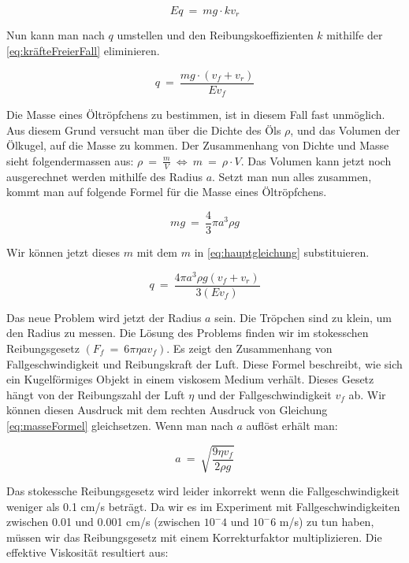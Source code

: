 \begin{equation}\label{eq:elektrischesFeld}
	Eq \ = \ mg \cdot kv_r
\end{equation}

\noindent Nun kann man nach $q$ umstellen und den Reibungskoeffizienten $k$ mithilfe der \autoref{eq:kräfteFreierFall} eliminieren. 

\begin{equation}\label{eq:hauptgleichung}
	q \ = \ \frac{mg \cdot (v_f + v_r)}{Ev_f}
\end{equation}

\noindent Die Masse eines Öltröpfchens zu bestimmen, ist in diesem Fall fast unmöglich. Aus diesem Grund versucht man über die Dichte des Öls $\rho$, und das Volumen der Ölkugel, auf die Masse zu kommen. Der Zusammenhang von Dichte und Masse sieht folgendermassen aus: $\rho \ = \ \frac{m}{V} \ \Leftrightarrow \ m \ = \ \rho \cdot V$. Das Volumen kann jetzt noch ausgerechnet werden mithilfe des Radius $a$. Setzt man nun alles zusammen, kommt man auf folgende Formel für die Masse eines Öltröpfchens. 

\begin{equation}\label{eq:masseFormel}
	mg \ = \ \frac{4}{3} \pi a^3 \rho g
\end{equation}

\noindent Wir können jetzt dieses $m$ mit dem $m$ in \autoref{eq:hauptgleichung} substituieren.

\begin{equation}\label{eq:ladungFormel}
	q \ = \ \frac{4\pi a^3\rho g (v_f + v_r)}{3(Ev_f)}
\end{equation}

\noindent Das neue Problem wird jetzt der Radius $a$ sein. Die Tröpchen sind zu klein, um den Radius zu messen. Die Lösung des Problems finden wir im stokesschen Reibungsgesetz $(F_f \ = \ 6\pi \eta a v_f)$. Es zeigt den Zusammenhang von Fallgeschwindigkeit und Reibungskraft der Luft. Diese Formel beschreibt, wie sich ein Kugelförmiges Objekt in einem viskosem Medium verhält. Dieses Gesetz hängt von der Reibungszahl der Luft $\eta$ und der Fallgeschwindigkeit $v_f$ ab. Wir können diesen Ausdruck mit dem rechten Ausdruck von Gleichung \ref{eq:masseFormel} gleichsetzen. Wenn man nach $a$ auflöst erhält man:

\begin{equation}\label{eq:stokesRadius}
	a \ = \ \sqrt{\frac{9\eta v_f}{2\rho g}}
\end{equation}

\noindent Das stokessche Reibungsgesetz wird leider inkorrekt wenn die Fallgeschwindigkeit weniger als 0.1 cm/s beträgt. Da wir es im Experiment mit Fallgeschwindigkeiten zwischen 0.01 und 0.001 cm/s (zwischen $10^-4$ und $10^-6$ m/s) zu tun haben, müssen wir das Reibungsgesetz mit einem Korrekturfaktor multiplizieren. Die effektive Viskosität resultiert aus:

